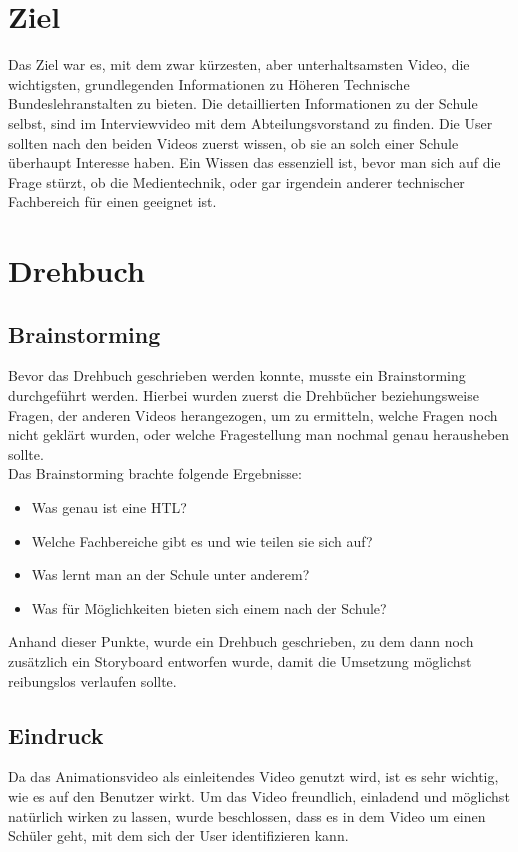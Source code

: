 \section{Ziel}
\renewcommand{\kapitelautor}{Autor: Niklas Kienreich}
Das Ziel war es, mit dem zwar kürzesten, aber unterhaltsamsten Video, die wichtigsten, grundlegenden Informationen zu Höheren Technische Bundeslehranstalten zu bieten. Die detaillierten Informationen zu der Schule selbst, sind im Interviewvideo mit dem Abteilungsvorstand zu finden. Die User sollten nach den beiden Videos zuerst wissen, ob sie an solch einer Schule überhaupt Interesse haben. Ein Wissen das essenziell ist, bevor man sich auf die Frage stürzt, ob die Medientechnik, oder gar irgendein anderer technischer Fachbereich für einen geeignet ist.
\section{Drehbuch}
\subsection{Brainstorming}
Bevor das Drehbuch geschrieben werden konnte, musste ein Brainstorming durchgeführt werden. Hierbei wurden zuerst die Drehbücher beziehungsweise Fragen, der anderen Videos herangezogen, um zu ermitteln, welche Fragen noch nicht geklärt wurden, oder welche Fragestellung man nochmal genau herausheben sollte.
\leavevmode \\
Das Brainstorming brachte folgende Ergebnisse:
\begin{itemize}
\item Was genau ist eine HTL?
\item Welche Fachbereiche gibt es und wie teilen sie sich auf?
\item Was lernt man an der Schule unter anderem?
\item Was für Möglichkeiten bieten sich einem nach der Schule?
\end{itemize}
Anhand dieser Punkte, wurde ein Drehbuch geschrieben, zu dem dann noch zusätzlich ein Storyboard entworfen wurde, damit die Umsetzung möglichst reibungslos verlaufen sollte.
\subsection{Eindruck}
Da das Animationsvideo als einleitendes Video genutzt wird, ist es sehr wichtig, wie es auf den Benutzer wirkt. Um das Video freundlich, einladend und möglichst natürlich wirken zu lassen, wurde beschlossen, dass es in dem Video um einen Schüler geht, mit dem sich der User identifizieren kann.
